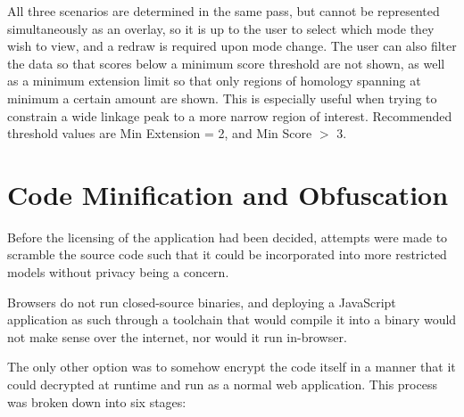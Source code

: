 All three scenarios are determined in the same pass, but cannot be represented simultaneously as an overlay, so it is up to the user to select which mode they wish to view, and a redraw is required upon mode change.  The user can also filter the data so that scores below a minimum score threshold are not shown, as well as a minimum extension limit so that only regions of homology spanning at minimum a certain amount are shown. This is especially useful when trying to constrain  a wide linkage peak to a more narrow region of interest. Recommended threshold values are Min Extension = 2, and Min Score $>$ 3.

\section{Code Minification and Obfuscation}

Before the licensing of the application had been decided, attempts were made to scramble the source code such that it could be incorporated into more restricted models without privacy being a concern.

Browsers do not run closed-source binaries, and deploying a JavaScript application as such through a toolchain that would compile it into a binary would not make sense over the internet, nor would it run in-browser.

The only other option was to somehow encrypt the code itself in a manner that it could decrypted at runtime and run as a normal web application. This process was broken down into six stages:

